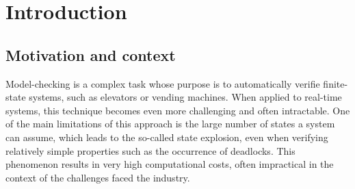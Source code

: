 \chapter{Introduction}

\section{Motivation and context}



Model-checking is a complex task whose purpose is to automatically verifie finite-state systems, such as elevators or vending machines. When applied to real-time systems, this technique becomes even more challenging and often intractable. One of the main limitations of this approach is the large number of states a system can assume, which leads to the so-called state explosion, even when verifying relatively simple properties such as the occurrence of deadlocks. This phenomenon results in very high computational costs, often impractical in the context of the challenges faced the industry.

